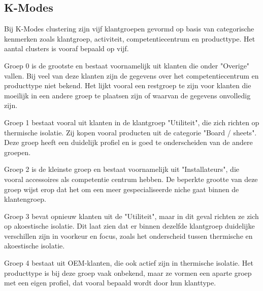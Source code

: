 \newpage

\subsection*{K-Modes}

Bij K-Modes clustering zijn vijf klantgroepen gevormd op basis van categorische kenmerken zoals klantgroep, activiteit, competentiecentrum en producttype. Het aantal clusters is vooraf bepaald op vijf.

\vspace{1em}

Groep 0 is de grootste en bestaat voornamelijk uit klanten die onder "Overige" vallen. Bij veel van deze klanten zijn de gegevens over het competentiecentrum en producttype niet bekend. Het lijkt vooral een restgroep te zijn voor klanten die moeilijk in een andere groep te plaatsen zijn of waarvan de gegevens onvolledig zijn.

\vspace{1em}

Groep 1 bestaat vooral uit klanten in de klantgroep "Utiliteit", die zich richten op thermische isolatie. Zij kopen vooral producten uit de categorie "Board / sheets". Deze groep heeft een duidelijk profiel en is goed te onderscheiden van de andere groepen.

\vspace{1em}

Groep 2 is de kleinste groep en bestaat voornamelijk uit "Installateurs", die vooral accessoires als competentie centrum hebben. De beperkte grootte van deze groep wijst erop dat het om een meer gespecialiseerde niche gaat binnen de klantengroep.

\vspace{1em}

Groep 3 bevat opnieuw klanten uit de "Utiliteit", maar in dit geval richten ze zich op akoestische isolatie. Dit laat zien dat er binnen dezelfde klantgroep duidelijke verschillen zijn in voorkeur en focus, zoals het onderscheid tussen thermische en akoestische isolatie.

\vspace{1em}

Groep 4 bestaat uit OEM-klanten, die ook actief zijn in thermische isolatie. Het producttype is bij deze groep vaak onbekend, maar ze vormen een aparte groep met een eigen profiel, dat vooral bepaald wordt door hun klanttype.

\vspace{1em}

